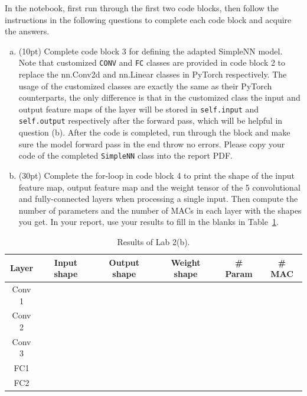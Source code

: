 \begin{assignment}[(40 points)]
In the notebook, first run through the first two code blocks, then follow the instructions in the following questions to complete each code block and acquire the answers. 

\begin{enumerate}[(a)]
\item (10pt) Complete code block 3 for defining the adapted SimpleNN model. Note that customized \texttt{CONV} and \texttt{FC} classes are provided in code block 2 to replace the nn.Conv2d and nn.Linear classes in PyTorch respectively. The usage of the customized classes are exactly the same as their PyTorch counterparts, the only difference is that in the customized class the input and output feature maps of the layer will be stored in \texttt{self.input} and \texttt{self.output} respectively after the forward pass, which will be helpful in question (b). After the code is completed, run through the block and make sure the model forward pass in the end throw no errors. Please copy your code of the completed \texttt{SimpleNN} class into the report PDF.
\item (30pt) Complete the for-loop in code block 4 to print the shape of the input feature map, output feature map and the weight tensor of the 5 convolutional and fully-connected layers when processing a single input. Then compute the number of parameters and the number of MACs in each layer with the shapes you get.
In your report, use your results to fill in the blanks in Table~\ref{tab:6b}.
\end{enumerate}

\end{assignment}

\begin{table} [h]
    \centering
    \begin{tabular}{|c|c|c|c|c|c|}
         \hline
         Layer & Input shape & Output shape & Weight shape & \# Param & \# MAC \\
         \hline
         Conv 1 &  &  &  &  &   \\
         Conv 2 &  &  &  &  &   \\
         Conv 3 &  &  &  &  &   \\
         FC1 &  &  &  &  &   \\
         FC2 &  &  &  &  &   \\
         \hline    \end{tabular}
    \caption{Results of Lab 2(b).}
    \label{tab:6b}
\end{table}


